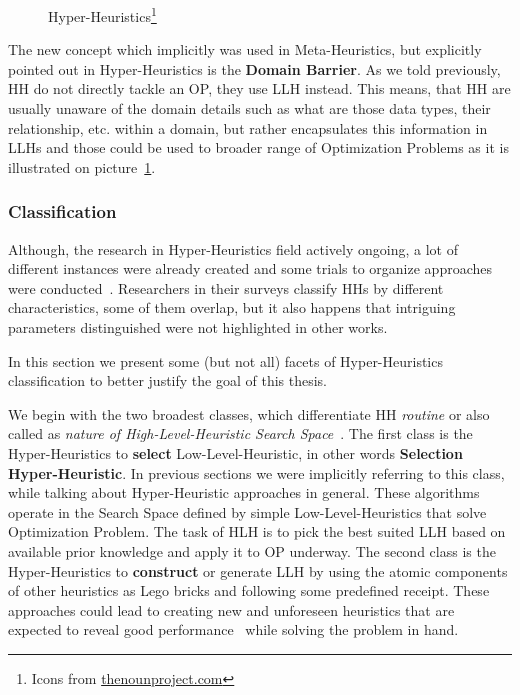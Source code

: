 \begin{figure}
	\centering
	
	\caption[Hyper-Heuristics]{Hyper-Heuristics\protect\footnote{Icons from \href{https://thenounproject.com/}{thenounproject.com}}}
	\label{bg:pic:HH}
\end{figure}



The new concept which implicitly was used in Meta-Heuristics, but explicitly pointed out in Hyper-Heuristics is the \textbf{Domain Barrier}.
As we told previously, HH do not directly tackle an OP, they use LLH instead. This means, that HH are usually unaware of the domain details such as what are those data types, their relationship, etc. within a domain, but rather encapsulates this information in LLHs and those could be used to broader range of Optimization Problems as it is illustrated on picture~\ref{bg:pic:HH}.


\subsubsection{Classification}
Although, the research in Hyper-Heuristics field actively ongoing, a lot of different instances were already created and some trials to organize approaches were conducted~\cite{ryser2014review,drake2019recent,burke2019classification,kerschke2019automated}.
Researchers in their surveys classify HHs by different characteristics, some of them overlap, but it also happens that intriguing parameters distinguished were not highlighted in other works. 

In this section we present some (but not all) facets of Hyper-Heuristics classification to better justify the goal of this thesis.


We begin with the two broadest classes, which differentiate HH \textit{routine} or also called as \textit{nature of High-Level-Heuristic Search Space}~\cite{burke2013hyper,burke2019classification,drake2019recent}.
The first class is the Hyper-Heuristics to \textbf{select} Low-Level-Heuristic, in other words \textbf{Selection Hyper-Heuristic}. In previous sections we were implicitly referring to this class, while talking about Hyper-Heuristic approaches in general. These algorithms operate in the Search Space defined by simple Low-Level-Heuristics that solve Optimization Problem. The task of HLH is to pick the best suited LLH based on available prior knowledge and apply it to OP underway.
The second class is the Hyper-Heuristics to \textbf{construct} or generate LLH by using the atomic components of other heuristics as Lego bricks and following some predefined receipt. These approaches could lead to creating new and unforeseen heuristics that are expected to reveal good performance~\cite{burke2019classification} while solving the problem in hand.


